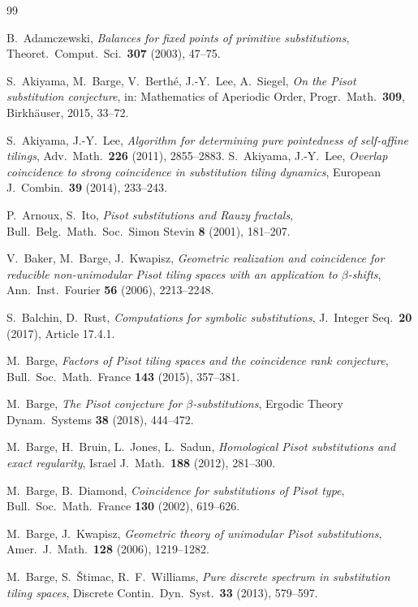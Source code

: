 \documentclass[11pt]{amsart}
\theoremstyle{plain}
\theoremstyle{definition}
\theoremstyle{remark}
\begin{document}
\begin{thebibliography}{99}

 B.~Adamczewski, \emph{Balances for fixed points of primitive substitutions}, Theoret.\ Comput.\ Sci.\ \textbf{307} (2003), 47--75.

 S.~Akiyama, M.~Barge, V.~Berth\'e, J.-Y.~Lee, A.~Siegel, \emph{On the Pisot substitution conjecture}, in: Mathematics of Aperiodic Order, Progr.\ Math.\ \textbf{309}, Birkh\"auser, 2015, 33--72.

 S.~Akiyama, J.-Y.~Lee, \emph{Algorithm for determining pure pointedness of self-affine tilings}, Adv.\ Math.\ \textbf{226} (2011), 2855--2883.
 S.~Akiyama, J.-Y.~Lee, \emph{Overlap coincidence to strong coincidence in substitution tiling dynamics}, European J.\ Combin.\ \textbf{39} (2014), 233--243.

 P.~Arnoux, S.~Ito, \emph{Pisot substitutions and Rauzy fractals}, Bull.\ Belg.\ Math.\ Soc.\ Simon Stevin \textbf{8} (2001), 181--207.

 V.~Baker, M.~Barge, J.~Kwapisz, \emph{Geometric realization and coincidence for reducible non-unimodular Pisot tiling spaces with an application to $\beta$-shifts}, Ann.\ Inst.\ Fourier \textbf{56} (2006), 2213--2248.

 S.~Balchin, D.~Rust, \emph{Computations for symbolic substitutions}, J.\ Integer Seq.\ \textbf{20} (2017), Article 17.4.1.

 M.~Barge, \emph{Factors of Pisot tiling spaces and the coincidence rank conjecture}, Bull.\ Soc.\ Math.\ France \textbf{143} (2015), 357--381.

 M.~Barge, \emph{The Pisot conjecture for $\beta$-substitutions}, Ergodic Theory Dynam.\ Systems \textbf{38} (2018), 444--472.

 M.~Barge, H.~Bruin, L.~Jones, L.~Sadun, \emph{Homological Pisot substitutions and exact regularity}, Israel J.\ Math.\ \textbf{188} (2012), 281--300.

 M.~Barge, B.~Diamond, \emph{Coincidence for substitutions of Pisot type}, Bull.\ Soc.\ Math.\ France \textbf{130} (2002), 619--626.

 M.~Barge, J.~Kwapisz, \emph{Geometric theory of unimodular Pisot substitutions}, Amer.\ J.\ Math.\ \textbf{128} (2006), 1219--1282.

 M.~Barge, S.~\v{S}timac, R.~F.~Williams, \emph{Pure discrete spectrum in substitution tiling spaces}, Discrete Contin.\ Dyn.\ Syst.\ \textbf{33} (2013), 579--597.


\end{thebibliography}
\end{document}
